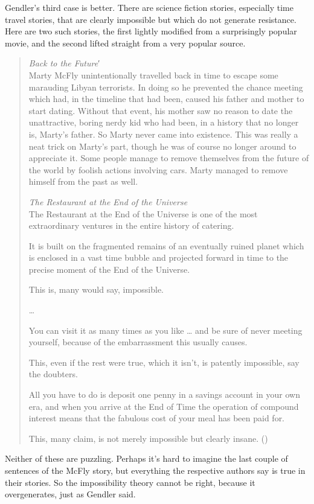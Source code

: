 \documentclass[
  10pt,
  letterpaper,
  DIV=11,
  numbers=noendperiod,
  twoside]{scrartcl}
\begin{document}
Gendler's third case is better. There are science fiction stories,
especially time travel stories, that are clearly impossible but which do
not generate resistance. Here are two such stories, the first lightly
modified from a surprisingly popular movie, and the second lifted
straight from a very popular source.

\begin{quote}
\emph{Back to the Future}′\\
Marty McFly unintentionally travelled back in time to escape some
marauding Libyan terrorists. In doing so he prevented the chance meeting
which had, in the timeline that had been, caused his father and mother
to start dating. Without that event, his mother saw no reason to date
the unattractive, boring nerdy kid who had been, in a history that no
longer is, Marty's father. So Marty never came into existence. This was
really a neat trick on Marty's part, though he was of course no longer
around to appreciate it. Some people manage to remove themselves from
the future of the world by foolish actions involving cars. Marty managed
to remove himself from the past as well.

\emph{The Restaurant at the End of the Universe}\\
The Restaurant at the End of the Universe is one of the most
extraordinary ventures in the entire history of catering.

It is built on the fragmented remains of an eventually ruined planet
which is enclosed in a vast time bubble and projected forward in time to
the precise moment of the End of the Universe.

This is, many would say, impossible.

\ldots{}

You can visit it as many times as you like \ldots{} and be sure of never
meeting yourself, because of the embarrassment this usually causes.

This, even if the rest were true, which it isn't, is patently
impossible, say the doubters.

All you have to do is deposit one penny in a savings account in your own
era, and when you arrive at the End of Time the operation of compound
interest means that the fabulous cost of your meal has been paid for.

This, many claim, is not merely impossible but clearly insane.
()
\end{quote}

Neither of these are puzzling. Perhaps it's hard to imagine the last
couple of sentences of the McFly story, but everything the respective
authors say is true in their stories. So the impossibility theory cannot
be right, because it overgenerates, just as Gendler said.
\end{document}
